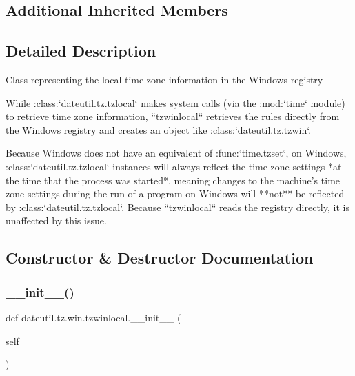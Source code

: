 \subsection*{Additional Inherited Members}


\subsection{Detailed Description}
\begin{DoxyVerb}Class representing the local time zone information in the Windows registry

While :class:`dateutil.tz.tzlocal` makes system calls (via the :mod:`time`
module) to retrieve time zone information, ``tzwinlocal`` retrieves the
rules directly from the Windows registry and creates an object like
:class:`dateutil.tz.tzwin`.

Because Windows does not have an equivalent of :func:`time.tzset`, on
Windows, :class:`dateutil.tz.tzlocal` instances will always reflect the
time zone settings *at the time that the process was started*, meaning
changes to the machine's time zone settings during the run of a program
on Windows will **not** be reflected by :class:`dateutil.tz.tzlocal`.
Because ``tzwinlocal`` reads the registry directly, it is unaffected by
this issue.
\end{DoxyVerb}
 

\subsection{Constructor \& Destructor Documentation}
\mbox{\label{classdateutil_1_1tz_1_1win_1_1tzwinlocal_a570ce1705314b330918aa8cdd7d09471}} 
\subsubsection{\texorpdfstring{\+\_\+\+\_\+init\+\_\+\+\_\+()}{\_\_init\_\_()}}
{\footnotesize\ttfamily def dateutil.\+tz.\+win.\+tzwinlocal.\+\_\+\+\_\+init\+\_\+\+\_\+ (\begin{DoxyParamCaption}\item[{}]{self }\end{DoxyParamCaption})}



